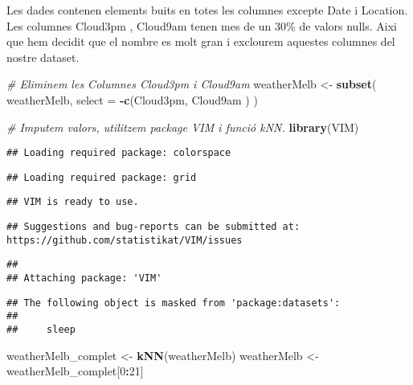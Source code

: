 \documentclass[
]{article}
\newenvironment{Shaded}{\begin{snugshade}}{\end{snugshade}}
\newcommand{\CommentTok}[1]{\textcolor[rgb]{0.56,0.35,0.01}{\textit{#1}}}
\newcommand{\DataTypeTok}[1]{\textcolor[rgb]{0.13,0.29,0.53}{#1}}
\newcommand{\DecValTok}[1]{\textcolor[rgb]{0.00,0.00,0.81}{#1}}
\newcommand{\KeywordTok}[1]{\textcolor[rgb]{0.13,0.29,0.53}{\textbf{#1}}}
\newcommand{\NormalTok}[1]{#1}
\newcommand{\OperatorTok}[1]{\textcolor[rgb]{0.81,0.36,0.00}{\textbf{#1}}}
\newcommand{\StringTok}[1]{\textcolor[rgb]{0.31,0.60,0.02}{#1}}
\begin{document}
Les dades contenen elements buits en totes les columnes excepte Date i
Location. Les columnes Cloud3pm , Cloud9am tenen mes de un 30\% de
valors nulls. Aixi que hem decidit que el nombre es molt gran i
exclourem aquestes columnes del nostre dataset.

\begin{Shaded}
\begin{Highlighting}[]
\CommentTok{# Eliminem les  Columnes Cloud3pm i Cloud9am}
\NormalTok{weatherMelb <-}\StringTok{ }\KeywordTok{subset}\NormalTok{( weatherMelb, }\DataTypeTok{select =} \OperatorTok{-}\KeywordTok{c}\NormalTok{(Cloud3pm, Cloud9am ) )}
\end{Highlighting}
\end{Shaded}

\begin{Shaded}
\begin{Highlighting}[]
\CommentTok{# Imputem valors, utilitzem package VIM i funció kNN.}
\KeywordTok{library}\NormalTok{(VIM)}
\end{Highlighting}
\end{Shaded}

\begin{verbatim}
## Loading required package: colorspace
\end{verbatim}

\begin{verbatim}
## Loading required package: grid
\end{verbatim}

\begin{verbatim}
## VIM is ready to use.
\end{verbatim}

\begin{verbatim}
## Suggestions and bug-reports can be submitted at: https://github.com/statistikat/VIM/issues
\end{verbatim}

\begin{verbatim}
## 
## Attaching package: 'VIM'
\end{verbatim}

\begin{verbatim}
## The following object is masked from 'package:datasets':
## 
##     sleep
\end{verbatim}

\begin{Shaded}
\begin{Highlighting}[]
\NormalTok{weatherMelb_complet <-}\StringTok{ }\KeywordTok{kNN}\NormalTok{(weatherMelb)}
\NormalTok{weatherMelb <-}\StringTok{ }\NormalTok{weatherMelb_complet[}\DecValTok{0}\OperatorTok{:}\DecValTok{21}\NormalTok{]}
\end{Highlighting}
\end{Shaded}
\end{document}
